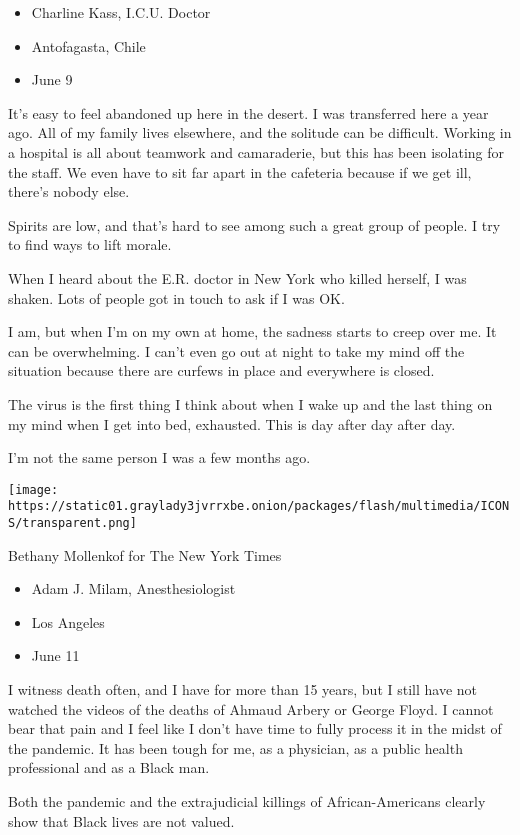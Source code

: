 \begin{itemize}
\tightlist
\item
  Charline Kass, I.C.U. Doctor
\item
  Antofagasta, Chile
\item
  June 9
\end{itemize}

It's easy to feel abandoned up here in the desert. I was transferred
here a year ago. All of my family lives elsewhere, and the solitude can
be difficult. Working in a hospital is all about teamwork and
camaraderie, but this has been isolating for the staff. We even have to
sit far apart in the cafeteria because if we get ill, there's nobody
else.

Spirits are low, and that's hard to see among such a great group of
people. I try to find ways to lift morale.

When I heard about the E.R. doctor in New York who killed herself, I was
shaken. Lots of people got in touch to ask if I was OK.

I am, but when I'm on my own at home, the sadness starts to creep over
me. It can be overwhelming. I can't even go out at night to take my mind
off the situation because there are curfews in place and everywhere is
closed.

The virus is the first thing I think about when I wake up and the last
thing on my mind when I get into bed, exhausted. This is day after day
after day.

I'm not the same person I was a few months ago.

\texttt{[image: https://static01.graylady3jvrrxbe.onion/packages/flash/multimedia/ICONS/transparent.png]}

Bethany Mollenkof for The New York Times

\begin{itemize}
\tightlist
\item
  Adam J. Milam, Anesthesiologist
\item
  Los Angeles
\item
  June 11
\end{itemize}

I witness death often, and I have for more than 15 years, but I still
have not watched the videos of the deaths of Ahmaud Arbery or George
Floyd. I cannot bear that pain and I feel like I don't have time to
fully process it in the midst of the pandemic. It has been tough for me,
as a physician, as a public health professional and as a Black man.

Both the pandemic and the extrajudicial killings of African-Americans
clearly show that Black lives are not valued.

